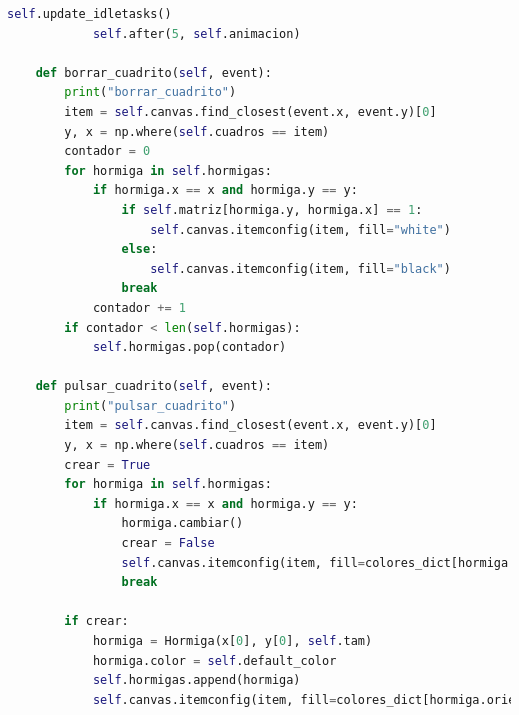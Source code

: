 \begin{lstlisting}[language=Python]
            self.update_idletasks()
            self.after(5, self.animacion)

    def borrar_cuadrito(self, event):
        print("borrar_cuadrito")
        item = self.canvas.find_closest(event.x, event.y)[0]
        y, x = np.where(self.cuadros == item)
        contador = 0
        for hormiga in self.hormigas:
            if hormiga.x == x and hormiga.y == y:
                if self.matriz[hormiga.y, hormiga.x] == 1:
                    self.canvas.itemconfig(item, fill="white")
                else:
                    self.canvas.itemconfig(item, fill="black")
                break
            contador += 1
        if contador < len(self.hormigas):
            self.hormigas.pop(contador)

    def pulsar_cuadrito(self, event):
        print("pulsar_cuadrito")
        item = self.canvas.find_closest(event.x, event.y)[0]
        y, x = np.where(self.cuadros == item)
        crear = True
        for hormiga in self.hormigas:
            if hormiga.x == x and hormiga.y == y:
                hormiga.cambiar()
                crear = False
                self.canvas.itemconfig(item, fill=colores_dict[hormiga.orientacion])
                break

        if crear:
            hormiga = Hormiga(x[0], y[0], self.tam)
            hormiga.color = self.default_color
            self.hormigas.append(hormiga)
            self.canvas.itemconfig(item, fill=colores_dict[hormiga.orientacion])


\end{lstlisting}

